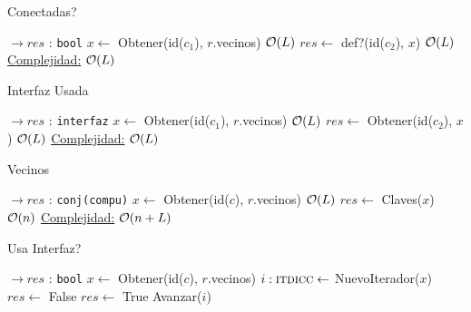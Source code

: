 \begin{Algoritmos}
\begin{algorithm}
\caption{Conectadas?}
\begin{algorithmic}[1]
    $\to res$ : \texttt{bool}
  \State $x \gets$ Obtener(id($c_1$), $r$.vecinos) \Comment $\mathcal{O}(L)$
  \State $res \gets$ def?(id($c_2$), $x$) \Comment $\mathcal{O}(L)$
 \EndProcedure
 \underline{Complejidad:} $\mathcal{O}(L)$
\end{algorithmic}
\end{algorithm}


\begin{algorithm}
\caption{Interfaz Usada}
\begin{algorithmic}[1]
   $\to res$ : \texttt{interfaz}
  \State $x \gets$ Obtener(id($c_1$), $r$.vecinos) \Comment $\mathcal{O}(L)$
  \State $res \gets$ Obtener(id($c_2$), $x$) \Comment $\mathcal{O}(L)$
 \EndProcedure
 \underline{Complejidad:} $\mathcal{O}(L)$
\end{algorithmic}
\end{algorithm}


\begin{algorithm}
\caption{Vecinos}
\begin{algorithmic}[1]
    $\to res$ : \texttt{conj(compu)}
  \State $x \gets$ Obtener(id($c$), $r$.vecinos) \Comment $\mathcal{O}(L)$
  \State $res \gets$ Claves($x$) \Comment $\mathcal{O}(n)$
 \EndProcedure
 \underline{Complejidad:} $\mathcal{O}(n+L)$
\end{algorithmic}
\end{algorithm}



\begin{algorithm}
\caption{Usa Interfaz?}
\begin{algorithmic}[1]
   $\to res$ : \texttt{bool} 
  \State $x \gets$ Obtener(id($c$), $r$.vecinos)
  \State $i :\textsc{itdicc} \gets$ NuevoIterador($x$)
  \State $res \gets$ False
     $res \gets$ True  \EndIf
    \State Avanzar($i$)
  \EndWhile
 \EndProcedure
\end{algorithmic}
\end{algorithm}



\end{Algoritmos}
